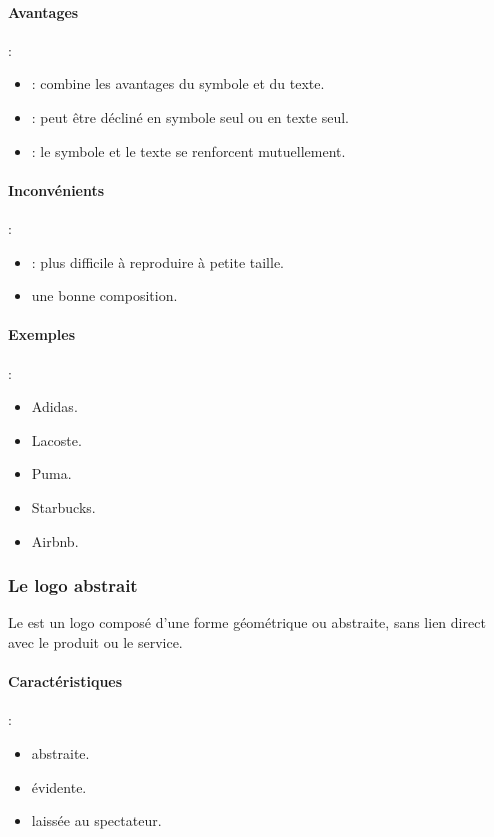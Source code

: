 \paragraph{Avantages} :
\begin{itemize}
    \item {} : combine les avantages du symbole et du texte.
    \item {} : peut être décliné en symbole seul ou en texte seul.
    \item {} : le symbole et le texte se renforcent mutuellement.
\end{itemize}

\paragraph{Inconvénients} :
\begin{itemize}
    \item {} : plus difficile à reproduire à petite taille.
    \item {} une bonne composition.
\end{itemize}

\paragraph{Exemples} :
\begin{itemize}
    \item Adidas.
    \item Lacoste.
    \item Puma.
    \item Starbucks.
    \item Airbnb.
\end{itemize}

\subsubsection{Le logo abstrait}

Le  est un logo composé d'une forme géométrique ou abstraite, sans lien direct avec le produit ou le service.

\paragraph{Caractéristiques} :
\begin{itemize}
    \item {} abstraite.
    \item {} évidente.
    \item {} laissée au spectateur.
\end{itemize}


